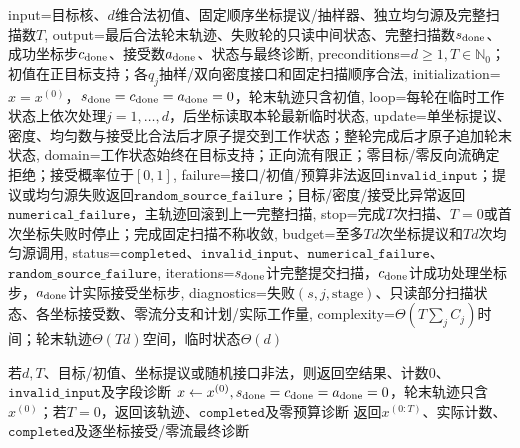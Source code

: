 \begin{AlgorithmContract}{
  input={目标核、$d$维合法初值、固定顺序坐标提议/抽样器、独立均匀源及完整扫描数$T$},
  output={最后合法轮末轨迹、失败轮的只读中间状态、完整扫描数$s_{\rm done}$、成功坐标步$c_{\rm done}$、接受数$a_{\rm done}$、状态与最终诊断},
  preconditions={$d\ge1,T\in\mathbb N_0$；初值在正目标支持；各$q_j$抽样/双向密度接口和固定扫描顺序合法},
  initialization={$x=x^{(0)}$，$s_{\rm done}=c_{\rm done}=a_{\rm done}=0$，轮末轨迹只含初值},
  loop={每轮在临时工作状态上依次处理$j=1,\ldots,d$，后坐标读取本轮最新临时状态},
  update={单坐标提议、密度、均匀数与接受比合法后才原子提交到工作状态；整轮完成后才原子追加轮末状态},
  domain={工作状态始终在目标支持；正向流有限正；零目标/零反向流确定拒绝；接受概率位于$[0,1]$},
  failure={接口/初值/预算非法返回$\mathtt{invalid\_input}$；提议或均匀源失败返回$\mathtt{random\_source\_failure}$；目标/密度/接受比异常返回$\mathtt{numerical\_failure}$，主轨迹回滚到上一完整扫描},
  stop={完成$T$次扫描、$T=0$或首次坐标失败时停止；完成固定扫描不称收敛},
  budget={至多$Td$次坐标提议和$Td$次均匀源调用},
  status={$\mathtt{completed}$、$\mathtt{invalid\_input}$、$\mathtt{numerical\_failure}$、$\mathtt{random\_source\_failure}$},
  iterations={$s_{\rm done}$计完整提交扫描，$c_{\rm done}$计成功处理坐标步，$a_{\rm done}$计实际接受坐标步},
  diagnostics={失败$(s,j,\mathrm{stage})$、只读部分扫描状态、各坐标接受数、零流分支和计划/实际工作量},
  complexity={$\Theta(T\sum_jC_j)$时间；轮末轨迹$\Theta(Td)$空间，临时状态$\Theta(d)$}
}
\begin{algorithm}[tbp]
\caption{固定顺序的单分量MH扫描}\label{alg:V5-C03-component-mh}
若$d,T$、目标/初值、坐标提议或随机接口非法，则返回空结果、计数$0$、$\mathtt{invalid\_input}$及字段诊断\;
$x\leftarrow x^{(0)},s_{\rm done}=c_{\rm done}=a_{\rm done}=0$，轮末轨迹只含$x^{(0)}$；若$T=0$，返回该轨迹、$\mathtt{completed}$及零预算诊断\;
返回$x^{(0:T)}$、实际计数、$\mathtt{completed}$及逐坐标接受/零流最终诊断\;
\end{algorithm}
\end{AlgorithmContract}
\endgroup

